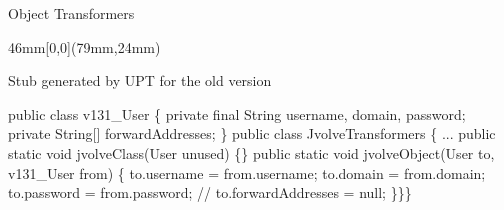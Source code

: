 \begin{frame}[fragile,shrink=5]{Object Transformers}%
 {
\begin{textblock*}{46mm}[0,0](79mm,24mm)
\begin{block}{}
Stub generated by UPT for the old version
\end{block}
\end{textblock*}
}
\begin{small}
\begin{semiverbatim}
public class v131_User \{
  private final String username, domain, password;
  private String[] forwardAddresses;
\}
public class JvolveTransformers \{
 ...
 public static void jvolveClass(User unused) \{\}
 public static void jvolveObject(User to, v131_User from) \{
    to.username = from.username;
    to.domain = from.domain;
    to.password = from.password;
    // to.forwardAddresses = null;
    \}\}\}

\end{semiverbatim}
\end{small}
\end{frame}
